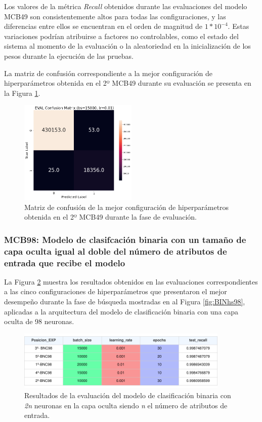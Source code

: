 Los valores de la métrica \textit{Recall} obtenidos durante las evaluaciones del modelo MCB49 son consistentemente altos para todas las configuraciones, y las diferencias entre ellos se encuentran en el orden de magnitud de $1*10^{-4}$. Estas variaciones podrían atribuirse a factores no controlables, como el estado del sistema al momento de la evaluación o la aleatoriedad en la inicialización de los pesos durante la ejecución de las pruebas.

La matriz de confusión correspondiente a la mejor configuración de hiperparámetros obtenida en el 2º MCB49 durante su evaluación se presenta en la Figura \ref{fig:MC_EVAL_MCB49}.

\begin{figure}[H]
    \centering
    \includegraphics[width=0.5\textwidth]{./img/evaluacion/matrices_confusion/MC_EVAL_MCB49.png}
    \caption{Matriz de confusión de la mejor configuración de hiperparámetros obtenida en el 2º MCB49 durante la fase de evaluación.}
    \label{fig:MC_EVAL_MCB49}
\end{figure}



\subsubsection{MCB98: Modelo de clasifcación binaria con un tamaño de capa oculta igual al doble del número de atributos de entrada que recibe el modelo}
La Figura \ref{fig:EVALMCB98} muestra los resultados obtenidos en las evaluaciones correspondientes a las cinco configuraciones de hiperparámetros que presentaron el mejor desempeño durante la fase de búsqueda mostradas en al Figura \ref{fig:BINhs98}, aplicadas a la arquitectura del modelo de clasificación binaria con una capa oculta de 98 neuronas.

\begin{figure}[H]
    \centering
    \includegraphics[width=0.9\textwidth]{./img/evaluacion/resultados/EVALMCB98.pdf}
    \caption{Resultados de la evaluación del modelo de clasificación binaria con \textit{2n} neuronas en la capa oculta siendo \textit{n} el número de atributos de entrada.}
    \label{fig:EVALMCB98}
\end{figure}


